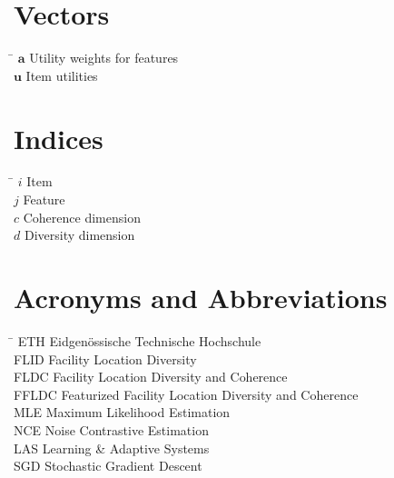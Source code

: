 \section*{Vectors}

\begin{tabbing}
  \hspace*{1.6cm} \= \kill
  $\mathbf{a}$ \> Utility weights for features \\ [0.5ex]
  $\mathbf{u}$ \> Item utilities \\ [0.5ex]
\end{tabbing}

\section*{Indices}

\begin{tabbing}
  \hspace*{1.6cm} \= \kill
  $i$ \> Item \\ [0.5ex]
  $j$ \> Feature \\ [0.5ex]
  $c$ \> Coherence dimension \\ [0.5ex]
  $d$ \> Diversity dimension \\ [0.5ex]
\end{tabbing}

\section*{Acronyms and Abbreviations}
\begin{tabbing}
 \hspace*{1.6cm}  \= \kill
 ETH \> Eidgenössische Technische Hochschule \\[0.5ex]
 FLID \> Facility Location Diversity \\[0.5ex]
 FLDC \> Facility Location Diversity and Coherence \\[0.5ex]
 FFLDC \> Featurized Facility Location Diversity and Coherence \\ [0.5ex]
 MLE \> Maximum Likelihood Estimation \\ [0.5ex]
 NCE \> Noise Contrastive Estimation \\ [0.5ex]
 LAS \> Learning \& Adaptive Systems \\ [0.5ex]
 SGD \> Stochastic Gradient Descent \\ [0.5ex]

\end{tabbing}